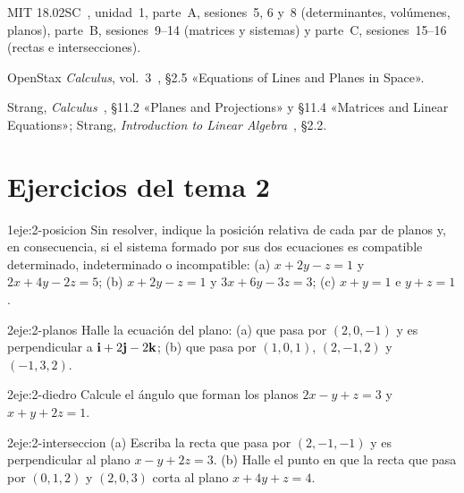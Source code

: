\begin{lecturas}
\item MIT 18.02SC~\cite{mit1802}, unidad~1, parte~A, sesiones~5, 6 y~8 (determinantes, volúmenes, planos), parte~B, sesiones~9--14 (matrices y sistemas) y parte~C, sesiones~15--16 (rectas e intersecciones).
\item OpenStax \emph{Calculus}, vol.~3~\cite{openstax3}, §2.5 «Equations of Lines and Planes in Space».
\item Strang, \emph{Calculus}~\cite{strangcalc}, §11.2 «Planes and Projections» y §11.4 «Matrices and Linear Equations»; Strang, \emph{Introduction to Linear Algebra}~\cite{strangla}, §2.2.
\end{lecturas}

\section*{Ejercicios del tema 2}

\begin{ejercicio}{1}{eje:2-posicion}
Sin resolver, indique la posición relativa de cada par de planos y, en consecuencia, si el sistema formado por sus dos ecuaciones es compatible determinado, indeterminado o incompatible: (a) $x+2y-z=1$ y $2x+4y-2z=5$; (b) $x+2y-z=1$ y $3x+6y-3z=3$; (c) $x+y=1$ e $y+z=1$.
\end{ejercicio}

\begin{ejercicio}{2}{eje:2-planos}
Halle la ecuación del plano: (a) que pasa por $(2,0,-1)$ y es perpendicular a $\mathbf{i}+2\mathbf{j}-2\mathbf{k}$; (b) que pasa por $(1,0,1)$, $(2,-1,2)$ y $(-1,3,2)$.
\end{ejercicio}

\begin{ejercicio}{2}{eje:2-diedro}
Calcule el ángulo que forman los planos $2x-y+z=3$ y $x+y+2z=1$.
\end{ejercicio}

\begin{ejercicio}{2}{eje:2-interseccion}
(a) Escriba la recta que pasa por $(2,-1,-1)$ y es perpendicular al plano $x-y+2z=3$. (b) Halle el punto en que la recta que pasa por $(0,1,2)$ y $(2,0,3)$ corta al plano $x+4y+z=4$.
\end{ejercicio}

